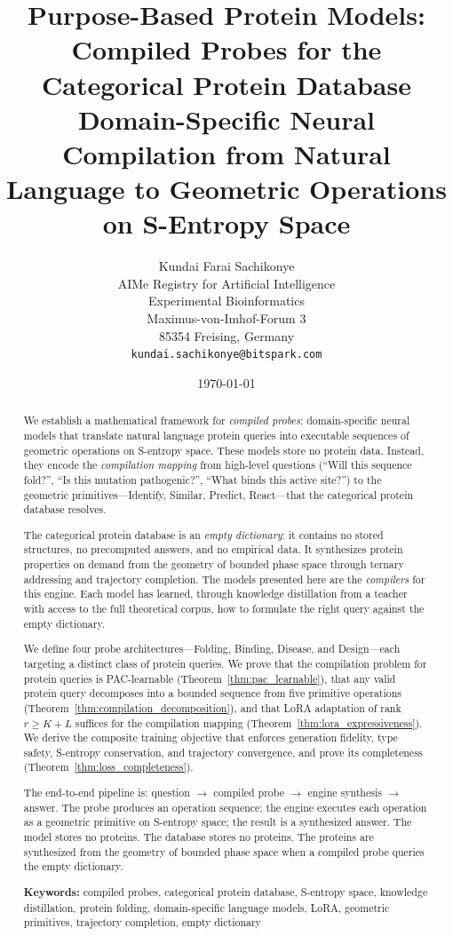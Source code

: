 \documentclass[11pt,twocolumn,a4paper]{article}
\title{Purpose-Based Protein Models: Compiled Probes for the Categorical Protein Database\\
\large Domain-Specific Neural Compilation from Natural Language to Geometric Operations on S-Entropy Space}
\author{
Kundai Farai Sachikonye\\
AIMe Registry for Artificial Intelligence\\
Experimental Bioinformatics\\
Maximus-von-Imhof-Forum 3\\
85354 Freising, Germany\\
\texttt{kundai.sachikonye@bitspark.com}
}
\date{\today}
\theoremstyle{definition}
\theoremstyle{remark}
\begin{document}
\maketitle

\begin{abstract}
We establish a mathematical framework for \emph{compiled probes}: domain-specific neural models that translate natural language protein queries into executable sequences of geometric operations on S-entropy space. These models store no protein data. Instead, they encode the \emph{compilation mapping} from high-level questions (``Will this sequence fold?'', ``Is this mutation pathogenic?'', ``What binds this active site?'') to the geometric primitives---Identify, Similar, Predict, React---that the categorical protein database resolves.

The categorical protein database is an \emph{empty dictionary}: it contains no stored structures, no precomputed answers, and no empirical data. It synthesizes protein properties on demand from the geometry of bounded phase space through ternary addressing and trajectory completion. The models presented here are the \emph{compilers} for this engine. Each model has learned, through knowledge distillation from a teacher with access to the full theoretical corpus, how to formulate the right query against the empty dictionary.

We define four probe architectures---Folding, Binding, Disease, and Design---each targeting a distinct class of protein queries. We prove that the compilation problem for protein queries is PAC-learnable (Theorem~\ref{thm:pac_learnable}), that any valid protein query decomposes into a bounded sequence from five primitive operations (Theorem~\ref{thm:compilation_decomposition}), and that LoRA adaptation of rank $r \geq K + L$ suffices for the compilation mapping (Theorem~\ref{thm:lora_expressiveness}). We derive the composite training objective that enforces generation fidelity, type safety, S-entropy conservation, and trajectory convergence, and prove its completeness (Theorem~\ref{thm:loss_completeness}).

The end-to-end pipeline is: question $\to$ compiled probe $\to$ engine synthesis $\to$ answer. The probe produces an operation sequence; the engine executes each operation as a geometric primitive on S-entropy space; the result is a synthesized answer. The model stores no proteins. The database stores no proteins. The proteins are synthesized from the geometry of bounded phase space when a compiled probe queries the empty dictionary.

\textbf{Keywords:} compiled probes, categorical protein database, S-entropy space, knowledge distillation, protein folding, domain-specific language models, LoRA, geometric primitives, trajectory completion, empty dictionary
\end{abstract}
\end{document}
